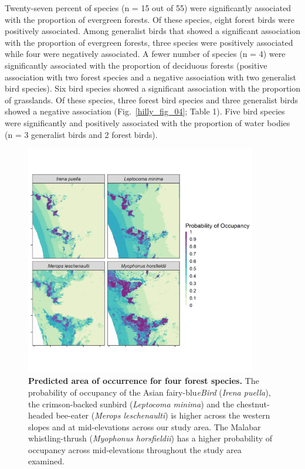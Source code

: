 Twenty-seven percent of species (n = 15 out of 55) were significantly associated with the proportion of evergreen forests.
Of these species, eight forest birds were positively associated.
Among generalist birds that showed a significant association with the proportion of evergreen forests, three species were positively associated while four were negatively associated.
A fewer number of species (n = 4) were significantly associated with the proportion of deciduous forests (positive association with two forest species and a negative association with two generalist bird species).
Six bird species showed a significant association with the proportion of grasslands.
Of these species, three forest bird species and three generalist birds showed a negative association (Fig.~\ref{hilly_fig_04}; Table 1).
Five bird species were significantly and positively associated with the proportion of water bodies (n = 3 generalist birds and 2 forest birds).

\begin{figure}[h!]
    \centering
    \includegraphics[width=0.9\textwidth]{figures/hillybirds/fig_06.png}
    \caption{
        \textbf{Predicted area of occurrence for four forest species.} 
        The probability of occupancy of the Asian fairy-blu\textit{eBird} (\textit{Irena puella}), the crimson-backed sunbird (\textit{Leptocoma minima}) and the chestnut-headed bee-eater (\textit{Merops leschenaulti}) is higher across the western slopes and at mid-elevations across our study area. The Malabar whistling-thrush (\textit{Myophonus horsfieldii}) has a higher probability of occupancy across mid-elevations throughout the study area examined.
    }
    \label{hilly_fig_06}
\end{figure}


